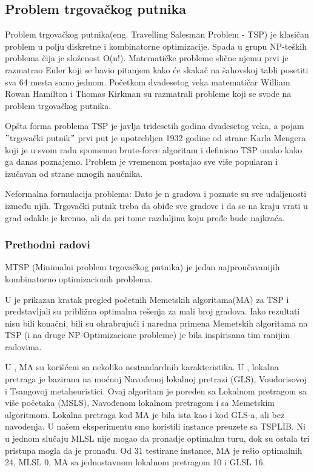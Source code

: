 \documentclass[a4paper]{article}
\begin{document}
\subsection{Problem trgovačkog putnika}
\label{sec:trgovacki_putnik}

Problem trgovačkog putnika(eng. Travelling Salesman Problem - TSP) je klasičan problem u polju diskretne i kombinatorne optimizacije. Spada u grupu NP-teških problema čija je složenost O(n!). Matematičke probleme slične njemu prvi je razmatrao Euler koji se bavio pitanjem kako će skakač na šahovskoj tabli posetiti sva 64 mesta samo jednom. Početkom dvadesetog veka matematičar William Rowan Hamilton i Thomas Kirkman su razmatrali probleme koji se svode na problem trgovačkog putnika. 


Opšta forma problema TSP je javlja tridesetih godina dvadesetog veka, a pojam $"$trgovački putnik$"$ prvi put je upotrebljen 1932 godine od strane Karla Mengera koji je u svom radu spomenuo brute-force algoritam i definisao TSP onako kako ga danas poznajemo. Problem je vremenom postajao sve više popularan i izučavan od strane mnogih naučnika.

Neformalna formulacija problema: Dato je n gradova i poznate su sve udaljenosti između njih. Trgovački putnik treba da obiđe sve gradove i da se na kraju vrati u grad odakle je krenuo, ali da pri tome razdaljina koju pređe bude najkraća.

\subsubsection{Prethodni radovi}
\label{subsec:prethodniRadovi}

MTSP (Minimalni problem trgovačkog putnika) je jedan najproučavanijih kombinatorno optimizacionih problema. 

U \cite{Handbook} je prikazan kratak pregled početnih Memetskih algoritama(MA) za TSP i predstavljali su približna optimalna rešenja za mali broj gradova. Iako rezultati nisu bili konačni, bili su ohrabrujući i naredna primena Memetskih algoritama na TSP (i na druge NP-Optimizacione probleme) je bila inspirisana tim ranijim radovima.


U \cite{Memetic}, MA su korišćeni sa nekoliko nestandardnih karakteristika. U \cite{Memetic}, lokalna pretraga je bazirana na moćnoj Navođenoj lokalnoj pretrazi (GLS), Voudorisovoj i Tsangovoj metaheuristici. Ovaj algoritam je poređen sa Lokalnom pretragom sa više početaka (MSLS), Navođenom lokalnom pretragom i sa Memetskim algoritmom. Lokalna pretraga kod MA je bila ista kao i kod GLS-a, ali bez navođenja. U našem eksperimentu smo koristili instance preuzete sa TSPLIB\cite{TSPLIB}. Ni u jednom slučaju MLSL nije mogao da pronadje optimalnu turu, dok su ostala tri pristupa mogla da je pronađu. Od 31 testirane instance, MA je rešio optimalnih 24, MLSL 0, MA sa jednostavnom lokalnom pretragom 10 i GLSL 16. 
\end{document}
